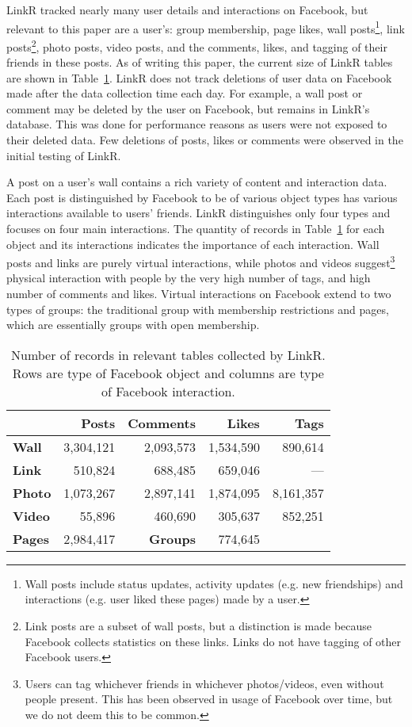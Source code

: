 \documentclass[letterpaper]{article}
\begin{document}
LinkR tracked nearly many user details and interactions on Facebook, but relevant to this paper are a user's: group membership, page likes, wall posts\footnote{Wall posts include status updates, activity updates (e.g. new friendships) and interactions (e.g. user liked these pages) made by a user.}, link posts\footnote{Link posts are a subset of wall posts, but a distinction is made because Facebook collects statistics on these links. Links do not have tagging of other Facebook users.}, photo posts, video posts, and the comments, likes, and tagging of their friends in these posts. As of writing this paper, the current size of LinkR tables are shown in Table~\ref{tab:db}. LinkR does not track deletions of user data on Facebook made after the data collection time each day. For example, a wall post or comment may be deleted by the user on Facebook, but remains in LinkR's database. This was done for performance reasons as users were not exposed to their deleted data. Few deletions of posts, likes or comments were observed in the initial testing of LinkR.


A post on a user's wall contains a rich variety of content and interaction data. Each post is distinguished by Facebook to be of various object types has various interactions available to users' friends. LinkR distinguishes only four types and focuses on four main interactions. The quantity of records in Table~\ref{tab:db} for each object and its interactions indicates the importance of each interaction. Wall posts and links are purely virtual interactions, while photos and videos suggest\footnote{Users can tag whichever friends in whichever photos/videos, even without people present. This has been observed in usage of Facebook over time, but we do not deem this to be common.} physical interaction with people by the very high number of tags, and high number of comments and likes. Virtual interactions on Facebook extend to two types of groups: the traditional group with membership restrictions and pages, which are essentially groups with open membership.


\begin{table}
\caption{\small Number of records in relevant tables collected by LinkR. Rows are type of Facebook object and columns are type of Facebook interaction.}
\label{tab:db}
\begin{tabular}{|>{\small}l|>{\small}r|>{\small}r|>{\small}r|>{\small}r|}
\hline
 & \textbf{Posts} & \textbf{Comments} & \textbf{Likes} & \textbf{Tags} \\
\hline
\textbf{Wall} & 3,304,121 & 2,093,573 & 1,534,590 & 890,614 \\
\hline
\textbf{Link} & 510,824 & 688,485 & 659,046 & --- \\
\hline
\textbf{Photo} & 1,073,267 & 2,897,141 & 1,874,095 & 8,161,357 \\
\hline
\textbf{Video} & 55,896 & 460,690 & 305,637 & 852,251 \\
\hline
\hline
\textbf{Pages} & 2,984,417 & \textbf{Groups} & 774,645 & \\
\hline
\end{tabular}
\end{table}
\end{document}
